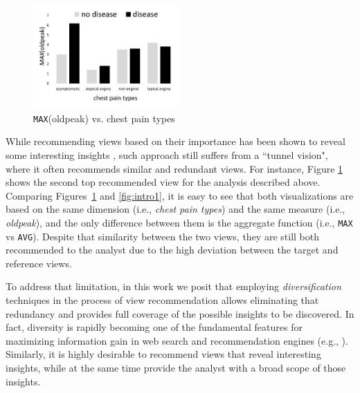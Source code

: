 \begin{figure}
	\includegraphics[width=2.2in]{figures/introduction/cp_max_oldpeak}
		\vspace{-10pt}

	\caption{ {\tt MAX}(oldpeak) vs. chest pain types}
	\label{fig:intro3}
		\vspace{-15pt}

\end{figure}


While recommending views based on their importance has been shown to reveal some interesting insights \cite{Vartak2015, Vartak2014, Ehsan2016}, such approach still suffers from  a ``tunnel vision", where it often recommends similar and redundant views. 
%
For instance, Figure \ref{fig:intro3} shows the second top recommended view for the analysis described above. 
%
Comparing Figures~\ref{fig:intro3} and \ref{fig:intro1}, it is easy to see that both visualizations are based on the same dimension (i.e., {\it chest pain types}) and the same measure (i.e., {\it oldpeak}), and the only difference between them is the aggregate function (i.e., {\tt MAX} vs {\tt AVG}). 
%
Despite that similarity between the two views, they are still both recommended to the analyst due to the high deviation between the target and reference views.



To address that limitation, in this work we posit that employing {\em diversification} techniques in the process of view recommendation allows eliminating that redundancy and provides full coverage of the possible insights to be discovered. 
%
In fact, diversity is rapidly becoming one of the fundamental features for maximizing information gain in web search and recommendation engines (e.g., \cite{Zhang2008,Clarke2008,Rafiei2010, Yu2009}). 
%
Similarly, it is highly desirable to recommend views that reveal interesting insights, while at the same time provide the analyst with a broad scope of those insights.



